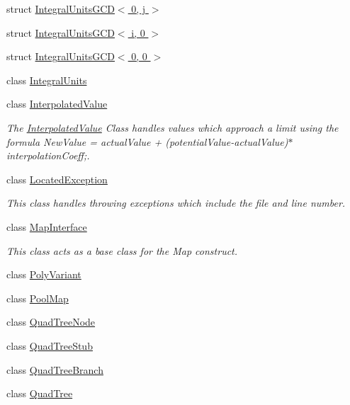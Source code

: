 \begin{CompactItemize}
\item 
struct \hyperlink{struct_j_g_t_l_1_1_integral_units_g_c_d_3_010_00_01j_01_4}{Integral\-Units\-GCD$<$ 0, j $>$}
\item 
struct \hyperlink{struct_j_g_t_l_1_1_integral_units_g_c_d_3_01i_00_010_01_4}{Integral\-Units\-GCD$<$ i, 0 $>$}
\item 
struct \hyperlink{struct_j_g_t_l_1_1_integral_units_g_c_d_3_010_00_010_01_4}{Integral\-Units\-GCD$<$ 0, 0 $>$}
\item 
class \hyperlink{class_j_g_t_l_1_1_integral_units}{Integral\-Units}
\item 
class \hyperlink{class_j_g_t_l_1_1_interpolated_value}{Interpolated\-Value}
\begin{CompactList}\small\item\em The \hyperlink{class_j_g_t_l_1_1_interpolated_value}{Interpolated\-Value} Class handles values which approach a limit using the formula New\-Value = actual\-Value + (potential\-Value-actual\-Value)$\ast$interpolation\-Coeff;. \item\end{CompactList}\item 
class \hyperlink{class_j_g_t_l_1_1_located_exception}{Located\-Exception}
\begin{CompactList}\small\item\em This class handles throwing exceptions which include the file and line number. \item\end{CompactList}\item 
class \hyperlink{class_j_g_t_l_1_1_map_interface}{Map\-Interface}
\begin{CompactList}\small\item\em This class acts as a base class for the Map construct. \item\end{CompactList}\item 
class \hyperlink{class_j_g_t_l_1_1_poly_variant}{Poly\-Variant}
\item 
class \hyperlink{class_j_g_t_l_1_1_pool_map}{Pool\-Map}
\item 
class \hyperlink{class_j_g_t_l_1_1_quad_tree_node}{Quad\-Tree\-Node}
\item 
class \hyperlink{class_j_g_t_l_1_1_quad_tree_stub}{Quad\-Tree\-Stub}
\item 
class \hyperlink{class_j_g_t_l_1_1_quad_tree_branch}{Quad\-Tree\-Branch}
\item 
class \hyperlink{class_j_g_t_l_1_1_quad_tree}{Quad\-Tree}

\end{CompactItemize}
